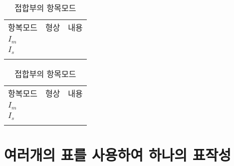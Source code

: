 \documentclass[12pt,a4paper]{report}
\begin{document}
		\begin{table}[h]
		\caption{접합부의 항목모드}

		\begin{subtable}[h]{\textwidth}
		\begin{center}
		\caption{접합부의 항목모드}
		\begin{tabu} to 0.8\textwidth { X[r,m, 1.0] X[c, 1.0] X[3.0] }
		\tabucline[0.2ex]{-}		
		항복모드	&형상		&내용\\
		\tabucline[0.2ex]{-}		
		$I_m$		&\\
		\tabucline[0.01ex]{-}		
		$I_s$			&\\
		\tabucline[0.1ex]{-}		
		\end{tabu}
		\end{center}
		\end{subtable}

		\begin{subtable}[h]{\textwidth}
		\caption{접합부의 항목모드}
		\begin{center}
		\begin{tabu} to 0.80\textwidth { X[r,m, 1.0] X[c, 1.0] X[3.0] }
		\tabucline[0.2ex]{-}		
		항복모드	&형상		&내용\\
		\tabucline[0.2ex]{-}		
		$I_m$		&\\
		\tabucline[0.01ex]{-}		
		$I_s$			&\\
		\tabucline[0.1ex]{-}		
		\end{tabu}
		\end{center}
		\end{subtable}

		\end{table}








%
%
%	
	\clearpage
	\section{여러개의 표를 사용하여 하나의 표작성}
\end{document}
